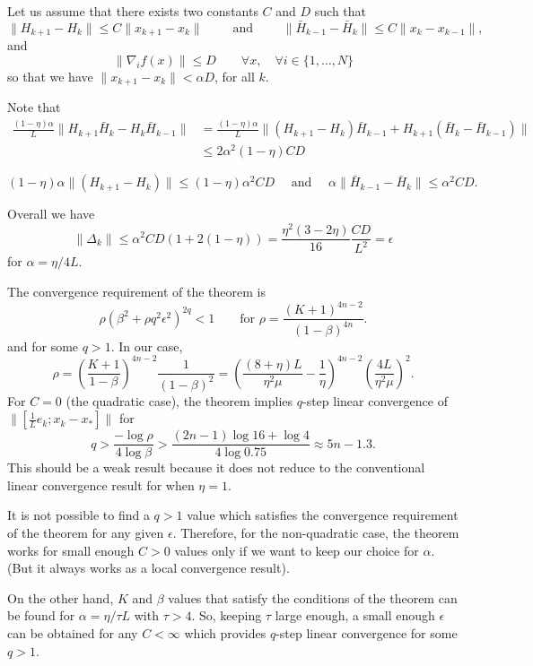 \documentclass[11pt]{article}
\begin{document}
\bigskip

Let us assume that there exists two constants $C$ and $D$ such that 
\[
 \|H_{k+1}-H_k\|\leq C\|x_{k+1}-x_k\| \qquad \mbox{ and } \qquad \|\bar H_{k-1}-\bar H_k\|\leq C\|x_k-x_{k-1}\|,
\]
and
\[
  \|\nabla_i f(x)\|\leq D \qquad \forall x, \quad \forall i\in\{1,\dots,N\}  
\]
so that we have $\|x_{k+1}-x_k\|<\alpha D$, for all $k$.

Note that 
\begin{align*}
     \frac{(1-\eta)\alpha}{L}\|H_{k+1}\bar H_k-H_k\bar H_{k-1}\| &= \frac{(1-\eta)\alpha}{L}\|(H_{k+1}-H_k)\bar H_{k-1}+H_{k+1}(\bar H_k-\bar H_{k-1})\|\\
     & \leq 2\alpha^2(1-\eta)C D
\end{align*}

\[
 (1-\eta)\alpha\|(H_{k+1}-H_k)\|\leq (1-\eta)\alpha^2CD  \quad \mbox{ and } \quad \alpha\|\bar H_{k-1}-\bar H_k\| \leq \alpha^2CD.
\]

\bigskip

Overall we have 
\[
 \|\Delta_k\| \leq \alpha^2CD(1 + 2(1-\eta)) = \frac{\eta^2(3-2\eta)}{16}\frac{CD}{L^2} = \epsilon
\]
for $\alpha = \eta / 4L$.

\bigskip

The convergence requirement of the theorem is 
\[
 \rho (\beta^2+\rho q^2 \epsilon^2)^{2q} < 1   \qquad \mbox{for } \rho = \frac{(K+1)^{4n-2}}{(1-\beta)^{4n}}.
\]
and for some $q>1$.  In our case,
\[
 \rho = \left(\frac{K+1}{1-\beta}\right)^{4n-2}\frac{1}{(1-\beta)^2} = \left(\frac{(8+\eta)L}{\eta^2\mu}-\frac{1}{\eta}\right)^{4n-2}\left(\frac{4L}{\eta^2\mu}\right)^2.
\]
For $C=0$ (the quadratic case), the theorem implies $q$-step linear convergence of $\|[\frac{1}{L}e_k; x_k-x_\ast]\|$ for 
\[
 q > \frac{-\log\rho}{4\log\beta} > \frac{(2n-1)\log 16 + \log 4}{4\log 0.75} \approx 5n-1.3.
\]
This should be a weak result because it does not reduce to the conventional linear convergence result for when $\eta=1$.

\bigskip

It is not possible to find a $q>1$ value which satisfies the convergence requirement of the theorem for any given $\epsilon$.  Therefore, for the non-quadratic case, the theorem works for small enough $C>0$ values only if we want to keep our choice for $\alpha$.  (But it always works as a local convergence result).  

\bigskip

On the other hand, $K$ and $\beta$ values that satisfy the conditions of the theorem can be found for $\alpha=\eta/\tau L$ with $\tau>4$.  So, keeping $\tau$ large enough, a small enough $\epsilon$ can be obtained for any $C<\infty$ which provides $q$-step linear convergence for some $q>1$.
\end{document}
